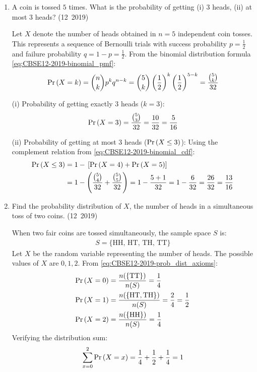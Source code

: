 \begin{enumerate}[label=\thesubsection.\arabic*, ref=\thesubsection.\theenumi]
\item A coin is tossed $5$ times. What is the probability of getting (i) $3$ heads, (ii) at most $3$ heads?
\hfill (12~2019)

\solution
Let $X$ denote the number of heads obtained in $n = 5$ independent coin tosses. This represents a sequence of Bernoulli trials with success probability $p = \frac{1}{2}$ and failure probability $q = 1 - p = \frac{1}{2}$.
From the binomial distribution formula \eqref{eq:CBSE12-2019-binomial_pmf}:
\begin{align}
	\Pr\left(X = k\right) = \binom{n}{k} p^k q^{n-k} = \binom{5}{k} \left(\frac{1}{2}\right)^k \left(\frac{1}{2}\right)^{5-k} = \frac{\binom{5}{k}}{32}
\end{align}

(i) Probability of getting exactly $3$ heads ($k = 3$):
\begin{align}
	\Pr\left(X = 3\right) = \frac{\binom{5}{3}}{32} = \frac{10}{32} = \frac{5}{16}
\end{align}

(ii) Probability of getting at most $3$ heads ($\Pr\left(X \le 3\right)$):
Using the complement relation from \eqref{eq:CBSE12-2019-binomial_cdf}:
\begin{align}
	\Pr\left(X \le 3\right) &= 1 - {}\left[\Pr\left(X = 4\right) + \Pr\left(X = 5\right)\right] \\
	&= 1 - \left(\frac{\binom{5}{4}}{32} + \frac{\binom{5}{5}}{32}\right) = 1 - \frac{5 + 1}{32} = 1 - \frac{6}{32} = \frac{26}{32} = \frac{13}{16}
\end{align}


\item Find the probability distribution of $X$, the number of heads in a simultaneous toss of two coins.
\hfill (12~2019)

\solution
When two fair coins are tossed simultaneously, the sample space $S$ is:
\begin{align}
	S = \{\text{HH}, \, \text{HT}, \, \text{TH}, \, \text{TT}\}
\end{align}
Let $X$ be the random variable representing the number of heads. The possible values of $X$ are $0, 1, 2$.
From \eqref{eq:CBSE12-2019-prob_dist_axioms}:
\begin{align}
	\Pr\left(X = 0\right) &= \frac{n(\{\text{TT}\})}{n(S)} = \frac{1}{4} \\
	\Pr\left(X = 1\right) &= \frac{n(\{\text{HT}, \text{TH}\})}{n(S)} = \frac{2}{4} = \frac{1}{2} \\
	\Pr\left(X = 2\right) &= \frac{n(\{\text{HH}\})}{n(S)} = \frac{1}{4}
\end{align}
Verifying the distribution sum:
\begin{align}
	\sum_{x=0}^{2} \Pr\left(X = x\right) = \frac{1}{4} + \frac{1}{2} + \frac{1}{4} = 1
\end{align}



\end{enumerate}
